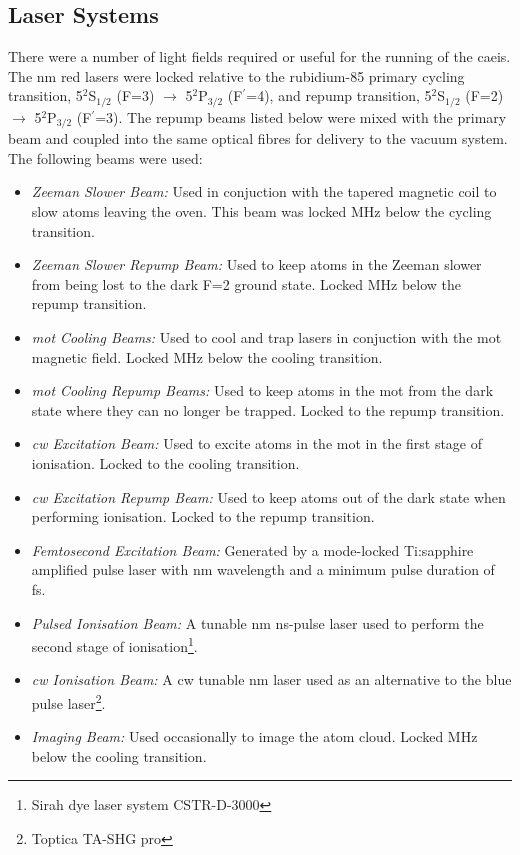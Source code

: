 \subsection{Laser Systems}
There were a number of light fields required or useful for the running of the \gls{caeis}.
The \unit[780]{nm} red lasers were locked relative to the rubidium-85 primary cycling transition, 5$^2$S$_{1/2}$ (F=3) $\rightarrow$ 5$^2$P$_{3/2}$ (F$^\prime$=4), and repump transition, 5$^2$S$_{1/2}$ (F=2) $\rightarrow$ 5$^2$P$_{3/2}$ (F$^\prime$=3).
The repump beams listed below were mixed with the primary beam and coupled into the same optical fibres for delivery to the vacuum system.
The following beams were used:
\begin{itemize}
    \item{\emph{Zeeman Slower Beam:}} Used in conjuction with the tapered magnetic coil to slow atoms leaving the oven. This beam was locked \unit[250]{MHz} below the cycling transition.
    \item{\emph{Zeeman Slower Repump Beam:}} Used to keep atoms in the Zeeman slower from being lost to the dark F=2 ground state. Locked \unit[250]{MHz} below the repump transition.
    \item{\emph{\Gls{mot} Cooling Beams:}} Used to cool and trap lasers in conjuction with the \gls{mot} magnetic field. Locked \unit[10]{MHz} below the cooling transition.
    \item{\emph{\Gls{mot} Cooling Repump Beams:}} Used to keep atoms in the \gls{mot} from the dark state where they can no longer be trapped. Locked to the repump transition.
    \item{\emph{\Gls{cw} Excitation Beam:}} Used to excite atoms in the \gls{mot} in the first stage of ionisation. Locked to the cooling transition.
    \item{\emph{\Gls{cw} Excitation Repump Beam:}} Used to keep atoms out of the dark state when performing ionisation. Locked to the repump transition.
    \item{\emph{Femtosecond Excitation Beam:}} Generated by a mode-locked Ti:sapphire amplified pulse laser with \unit[780-830]{nm} wavelength and a minimum pulse duration of \unit[35]{fs}.
    \item{\emph{Pulsed Ionisation Beam:}} A tunable \unit[457-493]{nm} \unit[10]{ns}-pulse laser used to perform the second stage of ionisation\footnote{Sirah dye laser system CSTR-D-3000}.
    \item{\emph{\Gls{cw} Ionisation Beam:}} A \gls{cw} tunable \unit[480]{nm} laser used as an alternative to the blue pulse laser\footnote{Toptica TA-SHG pro}.
    \item{\emph{Imaging Beam:}} Used occasionally to image the atom cloud. Locked \unit[4]{MHz} below the cooling transition.
\end{itemize}

